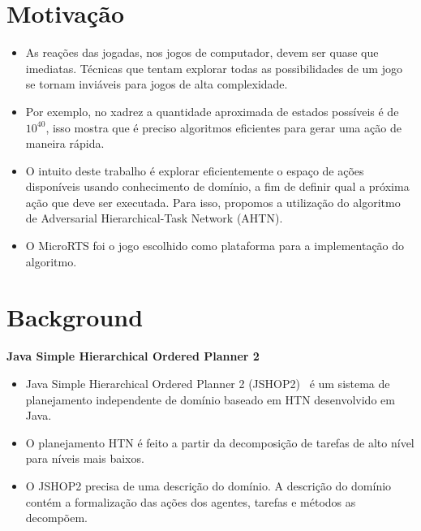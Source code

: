 \documentclass[a0,portrait]{a0poster}
\newcommand\itemadjust{\itemsep.5em \parskip0pt \parsep0pt}
\begin{document}
\begin{multicols}{2} 
	\color{NavyBlue}
	\color{Black}
	\raggedright
	\Large
	\color{NavyBlue}
	\section*{\huge Motiva\c{c}\~ao}
	\color{Black}
	
	\begin{itemize}
		\item As reações das jogadas, nos jogos de computador, devem ser quase que imediatas. Técnicas que tentam explorar todas as possibilidades de um jogo se tornam inviáveis para jogos de alta complexidade.
		\item Por exemplo, no xadrez a quantidade aproximada de estados possíveis é de $10^{40}$, isso mostra que é preciso algoritmos eficientes para gerar uma ação de maneira rápida. 
		\item O intuito deste trabalho é explorar eficientemente o espaço de ações disponíveis usando conhecimento de domínio, a fim de definir qual a próxima ação que deve ser executada. Para isso, propomos a utilização do algoritmo de Adversarial Hierarchical-Task Network (AHTN).
		\item O MicroRTS foi o jogo escolhido como plataforma para a implementação do algoritmo.
	\end{itemize}
	
	\color{NavyBlue}
	\section*{\huge Background}
	\color{Black}
	
	\textbf{Java Simple Hierarchical Ordered Planner 2}
	\begin{itemize}
		\item Java Simple Hierarchical Ordered Planner 2 (JSHOP2)~\cite{ilghami2006documentation} é um sistema de planejamento independente de domínio baseado em HTN desenvolvido em Java.
		\item O planejamento HTN é feito a partir da decomposição de tarefas de alto nível para níveis mais baixos. 
		\item O JSHOP2 precisa de uma descrição do domínio. A descrição do domínio contém a formalização das ações dos agentes, tarefas e métodos as decompõem.
	\end{itemize}
		

\end{multicols}
\end{document}
